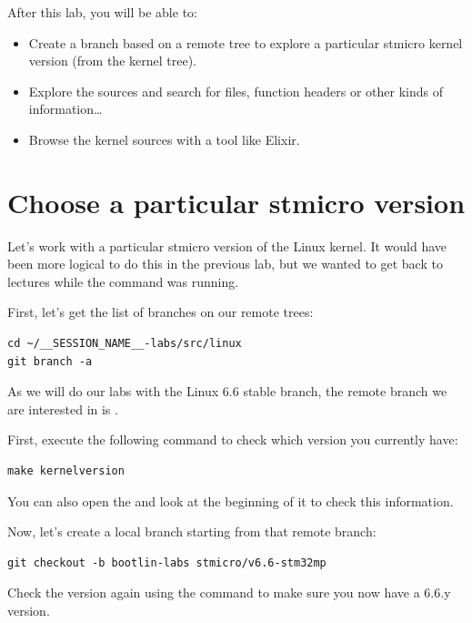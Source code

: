 
After this lab, you will be able to:

\begin{itemize}

\item Create a branch based on a remote tree to explore a particular
      stmicro kernel version (from the  kernel tree).
\item Explore the sources and search for files, function headers or
  other kinds of information\ldots
\item Browse the kernel sources with a tool like Elixir.
\end{itemize}

\section{Choose a particular stmicro version}

Let's work with a particular stmicro version of the Linux kernel.
It would have been more logical to do this in the previous lab, but we
wanted to get back to lectures while the  command was
running.

First, let's get the list of branches on our remote trees:

\begin{verbatim}
cd ~/__SESSION_NAME__-labs/src/linux
git branch -a
\end{verbatim}

As we will do our labs with the Linux 6.6 stable branch, the remote branch
we are interested in is .

First, execute the following command to check which version you
currently have:

\begin{verbatim}
make kernelversion
\end{verbatim}

You can also open the  and look at the beginning of it
to check this information.

Now, let's create a local branch starting from that remote branch:
\begin{verbatim}
git checkout -b bootlin-labs stmicro/v6.6-stm32mp
\end{verbatim}

Check the version again using the  command
to make sure you now have a 6.6.y version.

